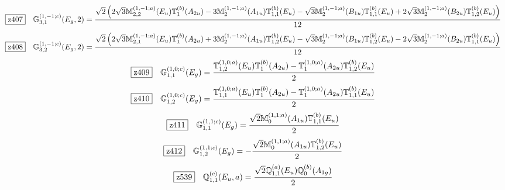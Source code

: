 \documentclass[fleqn,10pt,landscape]{jsarticle}
\begin{document}
\begin{dmath*}
\hspace*{3mm}\fbox{z407}\quad \mathbb{G}_{3,1}^{(1,-1;c)}(E_{g},2)=\frac{\sqrt{2} \left(2 \sqrt{3} \mathbb{M}_{2,2}^{(1,-1;a)}(E_{u}) \mathbb{T}_{1}^{(b)}(A_{2u}) - 3 \mathbb{M}_{2}^{(1,-1;a)}(A_{1u}) \mathbb{T}_{1,1}^{(b)}(E_{u}) - \sqrt{3} \mathbb{M}_{2}^{(1,-1;a)}(B_{1u}) \mathbb{T}_{1,1}^{(b)}(E_{u}) + 2 \sqrt{3} \mathbb{M}_{2}^{(1,-1;a)}(B_{2u}) \mathbb{T}_{1,2}^{(b)}(E_{u})\right)}{12}
\end{dmath*}
\begin{dmath*}
\hspace*{3mm}\fbox{z408}\quad \mathbb{G}_{3,2}^{(1,-1;c)}(E_{g},2)=\frac{\sqrt{2} \left(2 \sqrt{3} \mathbb{M}_{2,1}^{(1,-1;a)}(E_{u}) \mathbb{T}_{1}^{(b)}(A_{2u}) + 3 \mathbb{M}_{2}^{(1,-1;a)}(A_{1u}) \mathbb{T}_{1,2}^{(b)}(E_{u}) - \sqrt{3} \mathbb{M}_{2}^{(1,-1;a)}(B_{1u}) \mathbb{T}_{1,2}^{(b)}(E_{u}) - 2 \sqrt{3} \mathbb{M}_{2}^{(1,-1;a)}(B_{2u}) \mathbb{T}_{1,1}^{(b)}(E_{u})\right)}{12}
\end{dmath*}
\begin{dmath*}
\hspace*{3mm}\fbox{z409}\quad \mathbb{G}_{1,1}^{(1,0;c)}(E_{g})=\frac{\mathbb{T}_{1,2}^{(1,0;a)}(E_{u}) \mathbb{T}_{1}^{(b)}(A_{2u}) - \mathbb{T}_{1}^{(1,0;a)}(A_{2u}) \mathbb{T}_{1,2}^{(b)}(E_{u})}{2}
\end{dmath*}
\begin{dmath*}
\hspace*{3mm}\fbox{z410}\quad \mathbb{G}_{1,2}^{(1,0;c)}(E_{g})=\frac{\mathbb{T}_{1,1}^{(1,0;a)}(E_{u}) \mathbb{T}_{1}^{(b)}(A_{2u}) - \mathbb{T}_{1}^{(1,0;a)}(A_{2u}) \mathbb{T}_{1,1}^{(b)}(E_{u})}{2}
\end{dmath*}
\begin{dmath*}
\hspace*{3mm}\fbox{z411}\quad \mathbb{G}_{1,1}^{(1,1;c)}(E_{g})=\frac{\sqrt{2} \mathbb{M}_{0}^{(1,1;a)}(A_{1u}) \mathbb{T}_{1,1}^{(b)}(E_{u})}{2}
\end{dmath*}
\begin{dmath*}
\hspace*{3mm}\fbox{z412}\quad \mathbb{G}_{1,2}^{(1,1;c)}(E_{g})=- \frac{\sqrt{2} \mathbb{M}_{0}^{(1,1;a)}(A_{1u}) \mathbb{T}_{1,2}^{(b)}(E_{u})}{2}
\end{dmath*}
\begin{dmath*}
\hspace*{3mm}\fbox{z539}\quad \mathbb{Q}_{1,1}^{(c)}(E_{u},a)=\frac{\sqrt{2} \mathbb{Q}_{1,1}^{(a)}(E_{u}) \mathbb{Q}_{0}^{(b)}(A_{1g})}{2}
\end{dmath*}
\end{document}
